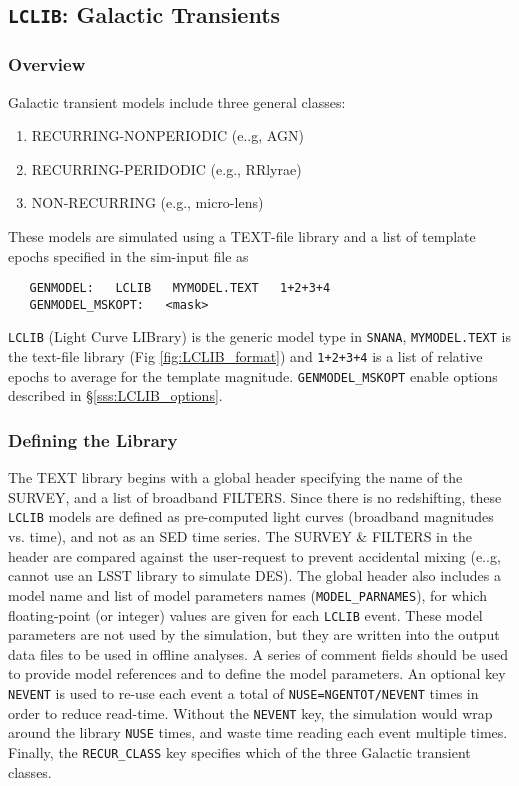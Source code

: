 \documentclass[12pt]{article}
\newcommand{\LCLIB}{{\tt LCLIB}}
\newcommand{\snana}{{\tt SNANA}}
\begin{document}
\subsection{{\LCLIB}: Galactic Transients}
\label{subsec:MODEL_LCLIB}

\subsubsection{Overview}
\label{sss:LCLIB_overview}

\noindent Galactic transient models include three general classes:
\begin{enumerate}
  \item RECURRING-NONPERIODIC (e..g, AGN)
  \item RECURRING-PERIDODIC  (e.g., RRlyrae)
  \item NON-RECURRING  (e.g., micro-lens)
\end{enumerate}
%
\noindent
These models are simulated using a TEXT-file library and a list of 
template epochs specified in the sim-input file as
%
\begin{verbatim}
   GENMODEL:   LCLIB   MYMODEL.TEXT   1+2+3+4
   GENMODEL_MSKOPT:   <mask>
\end{verbatim}
{\tt LCLIB} (Light Curve LIBrary) is the generic model type in \snana,
{\tt MYMODEL.TEXT} is the text-file library (Fig \ref{fig:LCLIB_format})
and {\tt 1+2+3+4} is a list of relative epochs to average for the template magnitude.
{\tt GENMODEL\_MSKOPT} enable options described in \S\ref{sss:LCLIB_options}.

\subsubsection{Defining the Library}
\label{sss:LCLIB_define}

The TEXT library begins with a global header specifying the name of the 
SURVEY, and a list of broadband FILTERS. Since there is no redshifting,
these {\tt LCLIB}  models are defined as pre-computed light curves
(broadband magnitudes vs. time), and not as an SED time series.
The SURVEY \& FILTERS in the header are compared against the user-request 
to prevent accidental mixing (e..g, cannot use an LSST library to simulate DES).
The global header also includes a model name and list of model parameters
names ({\tt MODEL\_PARNAMES}), for which floating-point (or integer)
values are given for each {\tt LCLIB} event. These model parameters are
not used by the simulation, but  they are written into the output data files 
to be used in offline analyses.
A series of comment fields should be used to provide model references and 
to define the model parameters.
An optional key {\tt NEVENT} is used to re-use each event  a total of
{\tt NUSE=NGENTOT/NEVENT} times in order to reduce read-time. 
Without the {\tt NEVENT} key, the simulation would wrap around the 
library {\tt NUSE} times, and waste time reading each event multiple times.
Finally, the {\tt RECUR\_CLASS} key specifies which of the three 
Galactic transient classes.
\end{document}
